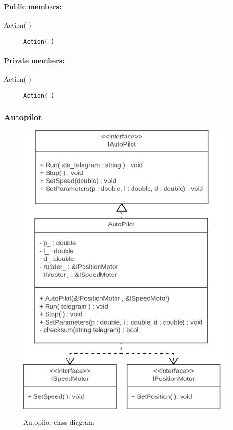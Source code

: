 \paragraph{Public members:}
\begin{adjustwidth}{2.5em}{0pt}\begin{description}
		\item [Action( )] \texttt{Action( )} 
\end{description}\end{adjustwidth}

\paragraph{Private members:}
\begin{adjustwidth}{2.5em}{0pt}\begin{description}
		\item [Action( )] \texttt{Action( )}
\end{description}\end{adjustwidth}

\subsubsection{Autopilot}

\begin{figure}[H]
\centering
\includegraphics[width=1\linewidth]{Images/Design/Autopilot_class_diagram}
\caption{Autopilot class diagram}
\label{fig:Autopilot}
\end{figure}

